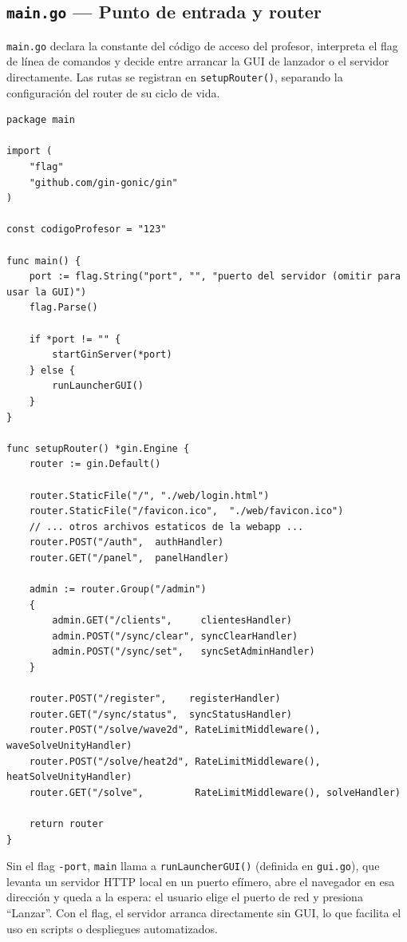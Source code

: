 \documentclass[12pt, a4paper]{article}
\begin{document}
\subsection{\texttt{main.go} — Punto de entrada y router}

\texttt{main.go} declara la constante del código de acceso del profesor, interpreta
el flag de línea de comandos y decide entre arrancar la GUI de lanzador o el servidor
directamente. Las rutas se registran en \texttt{setupRouter()}, separando la
configuración del router de su ciclo de vida.

\begin{lstlisting}[style=golang, caption={\texttt{main.go} completo}]
package main

import (
    "flag"
    "github.com/gin-gonic/gin"
)

const codigoProfesor = "123"

func main() {
    port := flag.String("port", "", "puerto del servidor (omitir para usar la GUI)")
    flag.Parse()

    if *port != "" {
        startGinServer(*port)
    } else {
        runLauncherGUI()
    }
}

func setupRouter() *gin.Engine {
    router := gin.Default()

    router.StaticFile("/", "./web/login.html")
    router.StaticFile("/favicon.ico",  "./web/favicon.ico")
    // ... otros archivos estaticos de la webapp ...
    router.POST("/auth",  authHandler)
    router.GET("/panel",  panelHandler)

    admin := router.Group("/admin")
    {
        admin.GET("/clients",     clientesHandler)
        admin.POST("/sync/clear", syncClearHandler)
        admin.POST("/sync/set",   syncSetAdminHandler)
    }

    router.POST("/register",    registerHandler)
    router.GET("/sync/status",  syncStatusHandler)
    router.POST("/solve/wave2d", RateLimitMiddleware(), waveSolveUnityHandler)
    router.POST("/solve/heat2d", RateLimitMiddleware(), heatSolveUnityHandler)
    router.GET("/solve",         RateLimitMiddleware(), solveHandler)

    return router
}
\end{lstlisting}

Sin el flag \texttt{-port}, \texttt{main} llama a \texttt{runLauncherGUI()} (definida
en \texttt{gui.go}), que levanta un servidor HTTP local en un puerto efímero, abre el
navegador en esa dirección y queda a la espera: el usuario elige el puerto de red y
presiona ``Lanzar''. Con el flag, el servidor arranca directamente sin GUI, lo que
facilita el uso en scripts o despliegues automatizados.
\end{document}
